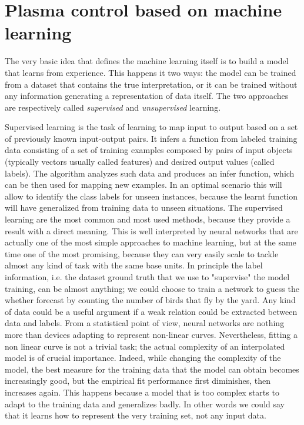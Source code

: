 \section{Plasma control based on machine learning}

The very basic idea that defines the machine learning itself is to build a model that learns from experience. This happens it two ways: the model can be trained from a dataset that contains the true interpretation, or it can be trained without any information generating a representation of data itself. The two approaches are respectively called \textit{supervised} and \textit{unsupervised} learning.

Supervised learning is the task of learning to map input to output based on a set of previously known input-output pairs. It infers a function from labeled training data consisting of a set of training examples composed by pairs of input objects (typically vectors usually called features) and desired output values (called labels). The algorithm analyzes such data and produces an infer function, which can be then used for mapping new examples. In an optimal scenario this will allow to identify the class labels for unseen instances, because the learnt function will have generalized from training data to unseen situations.
The supervised learning are the most common and most used methods, because they provide a result with a direct meaning. 
This is well interpreted by neural networks that are actually one of the most simple approaches to machine learning, but at the same time one of the most promising, because they can very easily scale to tackle almost any kind of task with the same base units.
%
In principle the label information, i.e. the dataset ground truth that we use to "supervise" the model training, can be almost anything; we could choose to train a network to guess the whether forecast by counting the number of birds that fly by the yard. Any kind of data could be a useful argument if a weak relation could be extracted between data and labels.
From a statistical point of view, neural networks are nothing more than devices adapting to represent non-linear curves. 
Nevertheless, fitting a non linear curve is not a trivial task; the actual complexity of an interpolated model is of crucial importance. 
Indeed, while changing the complexity of the model, the best measure for the training data that the model can obtain becomes increasingly good, but the empirical fit performance first diminishes, then increases again. This happens because a model that is too complex starts to adapt to the training data and generalizes badly. In other words we could say that it learns how to represent the very training set, not any input data.
